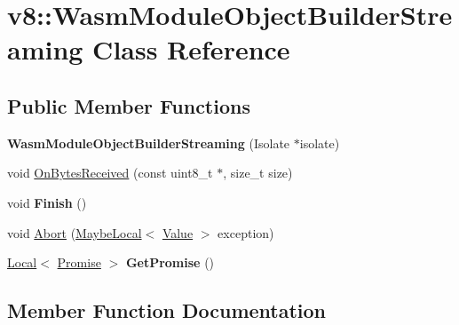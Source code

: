 \hypertarget{classv8_1_1WasmModuleObjectBuilderStreaming}{}\section{v8\+:\+:Wasm\+Module\+Object\+Builder\+Streaming Class Reference}
\label{classv8_1_1WasmModuleObjectBuilderStreaming}
\subsection*{Public Member Functions}
\begin{DoxyCompactItemize}
\item 
\mbox{\label{classv8_1_1WasmModuleObjectBuilderStreaming_a38ecb92cde61095525a4b2728ba091aa}} 
{\bfseries Wasm\+Module\+Object\+Builder\+Streaming} (Isolate $\ast$isolate)
\item 
void \mbox{\hyperlink{classv8_1_1WasmModuleObjectBuilderStreaming_ac67b675b7241a18a3b773dab2f0fd458}{On\+Bytes\+Received}} (const uint8\+\_\+t $\ast$, size\+\_\+t size)
\item 
\mbox{\label{classv8_1_1WasmModuleObjectBuilderStreaming_a679a8781a81a4c926e82924d1a2f2446}} 
void {\bfseries Finish} ()
\item 
void \mbox{\hyperlink{classv8_1_1WasmModuleObjectBuilderStreaming_ac8a2a6e122799d746ded69f80a295fb5}{Abort}} (\mbox{\hyperlink{classv8_1_1MaybeLocal}{Maybe\+Local}}$<$ \mbox{\hyperlink{classv8_1_1Value}{Value}} $>$ exception)
\item 
\mbox{\label{classv8_1_1WasmModuleObjectBuilderStreaming_a1b5def1cfb9746d6e196a5a44ffe6308}} 
\mbox{\hyperlink{classv8_1_1Local}{Local}}$<$ \mbox{\hyperlink{classv8_1_1Promise}{Promise}} $>$ {\bfseries Get\+Promise} ()
\end{DoxyCompactItemize}


\subsection{Member Function Documentation}
\mbox{\label{classv8_1_1WasmModuleObjectBuilderStreaming_ac8a2a6e122799d746ded69f80a295fb5}} 
